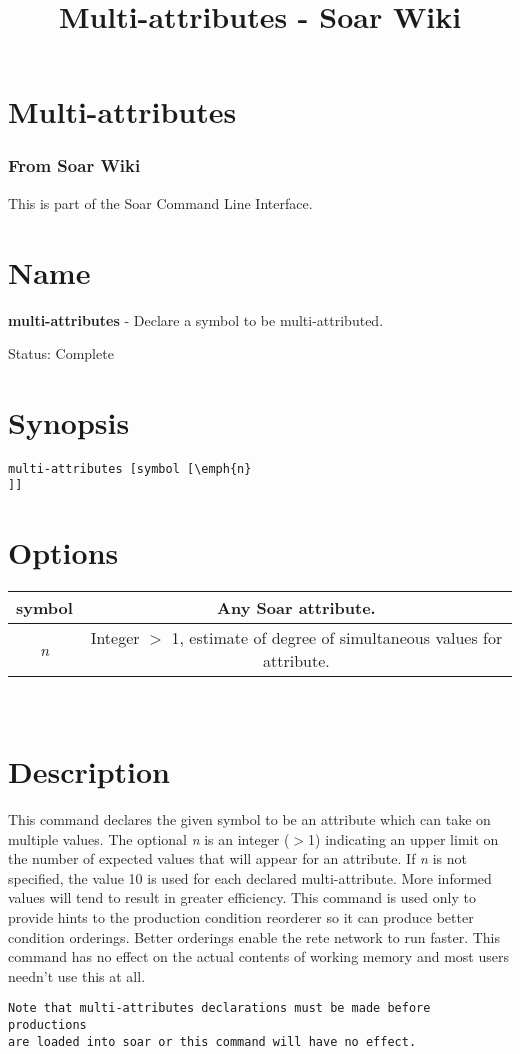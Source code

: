 \documentclass[10pt]{article}
\title{Multi-attributes - Soar Wiki}
\begin{document}
\section*{Multi-attributes}
\subsubsection*{From Soar Wiki}


 This is part of the Soar Command Line Interface. 
\section*{ Name }


 \textbf{multi-attributes}
 - Declare a symbol to be multi-attributed. 


 Status: Complete
\section*{ Synopsis }
\begin{verbatim}
multi-attributes [symbol [\emph{n}
]] 

\end{verbatim}
\section*{ Options }


\begin{tabular}{|c|c|}
\hline 
symbol & Any Soar attribute.  \\
 \hline 
\emph{n}
 & Integer $>$ 1, estimate of degree of simultaneous values for attribute.  \\
 \hline 

\end{tabular}



 \\ 

\section*{ Description }


 This command declares the given symbol to be an attribute which can take on multiple values. The optional \emph{n}
 is an integer ($>$1) indicating an upper limit on the number of expected values that will appear for an attribute. If \emph{n}
 is not specified, the value 10 is used for each declared multi-attribute. More informed values will tend to result in greater efficiency. This command is used only to provide hints to the production condition reorderer so it can produce better condition orderings. Better orderings enable the rete network to run faster. This command has no effect on the actual contents of working memory and most users needn't use this at all. \begin{verbatim}
Note that multi-attributes declarations must be made before productions 
are loaded into soar or this command will have no effect.

\end{verbatim}
\end{document}
